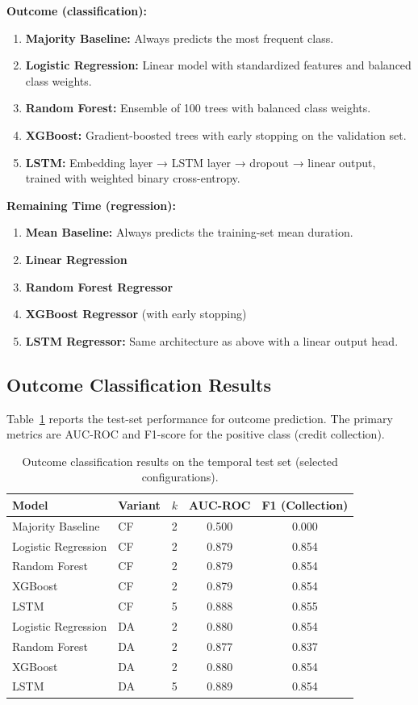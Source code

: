 \textbf{Outcome (classification):}
\begin{enumerate}
    \item \textbf{Majority Baseline:} Always predicts the most frequent class.
    \item \textbf{Logistic Regression:} Linear model with standardized features and balanced class weights.
    \item \textbf{Random Forest:} Ensemble of 100 trees with balanced class weights.
    \item \textbf{XGBoost:} Gradient-boosted trees with early stopping on the validation set.
    \item \textbf{LSTM:} Embedding layer → LSTM layer → dropout → linear output, trained with weighted binary cross-entropy.
\end{enumerate}

\textbf{Remaining Time (regression):}
\begin{enumerate}
    \item \textbf{Mean Baseline:} Always predicts the training-set mean duration.
    \item \textbf{Linear Regression}
    \item \textbf{Random Forest Regressor}
    \item \textbf{XGBoost Regressor} (with early stopping)
    \item \textbf{LSTM Regressor:} Same architecture as above with a linear output head.
\end{enumerate}

\subsection{Outcome Classification Results}

Table~\ref{tab:outcome_results} reports the test-set performance for outcome prediction. The primary metrics are AUC-ROC and F1-score for the positive class (credit collection).

\begin{table}[H]
\centering
\begin{tabular}{llccc}
\toprule
\textbf{Model} & \textbf{Variant} & \textbf{$k$} & \textbf{AUC-ROC} & \textbf{F1 (Collection)} \\
\midrule
Majority Baseline & CF & 2 & 0.500 & 0.000 \\
Logistic Regression & CF & 2 & 0.879 & 0.854 \\
Random Forest & CF & 2 & 0.879 & 0.854 \\
XGBoost & CF & 2 & 0.879 & 0.854 \\
LSTM & CF & 5 & 0.888 & 0.855 \\
\midrule
Logistic Regression & DA & 2 & 0.880 & 0.854 \\
Random Forest & DA & 2 & 0.877 & 0.837 \\
XGBoost & DA & 2 & 0.880 & 0.854 \\
LSTM & DA & 5 & 0.889 & 0.854 \\
\bottomrule
\end{tabular}
\caption{Outcome classification results on the temporal test set (selected configurations).}
\label{tab:outcome_results}
\end{table}


